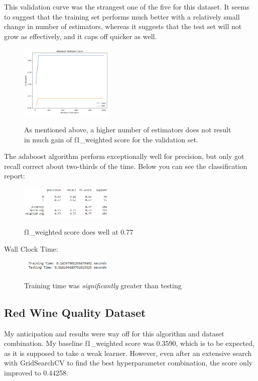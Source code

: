 \documentclass[conference]{IEEEtran}
\begin{document}
This validation curve was the strangest one of the five for this dataset. It seems to suggest that the training set performs much better with a relatively small change in number of estimators, whereas it suggests that the test set will not grow as effectively, and it caps off quicker as well. 

\begin{figure}[H]
    \centering
    \includegraphics[width=0.40\textwidth]{PIMA Indian Diabetes Graphs/Adaboost/ada vc.png}
    \label{fig:enter-label}
    \caption{As mentioned above, a higher number of estimators does not result in much gain of f1\_weighted score for the validation set.}
\end{figure}

The adaboost algorithm perform exceptionally well for precision, but only got recall correct about two-thirds of the time. Below you can see the classification report: 

\begin{figure}[H]
    \centering
    \includegraphics[width=0.40\textwidth]{PIMA Indian Diabetes Graphs/Adaboost/ada cr.png}
    \label{fig:enter-label}
    \caption{f1\_weighted score does well at 0.77}
\end{figure}

Wall Clock Time:
\begin{figure}[H]
    \centering
    \includegraphics[width=0.40\textwidth]{PIMA Indian Diabetes Graphs/Adaboost/ada wct.png}
    \label{fig:enter-label}
    \caption{Training time was \emph{significantly} greater than testing}
\end{figure}

\subsection{\textbf{Red Wine Quality Dataset}}\label{BB}
My anticipation and results were way off for this algorithm and dataset combination. My baseline f1\_weighted score was 0.3590, which is to be expected, as it is supposed to take a weak learner. However, even after an extensive search with GridSearchCV to find the best hyperparameter combination, the score only improved to 0.44258. 
\end{document}
